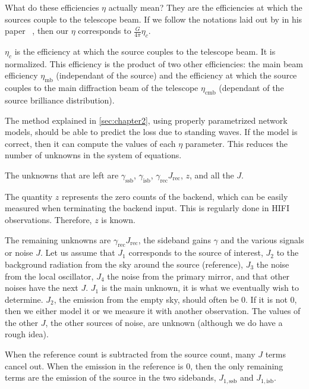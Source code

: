 What do these efficiencies $\eta$ actually mean?
They are the efficiencies at which the sources couple to the telescope beam.
If we follow the notations laid out by \citeauthor{mangum2006tempscales} in his paper ~\cite{mangum2006tempscales},
then our $\eta$ corresponds to $\frac{G}{4\pi}\eta_c$.

$\eta_c$ is the efficiency at which the source couples to the telescope beam.
It is normalized.
This efficiency is the product of two other efficiencies: the main beam efficiency $\eta_\text{mb}$ (independant of the source) and the efficiency at which the source couples to the main diffraction beam of the telescope $\eta_\text{cmb}$ (dependant of the source brilliance distribution).




The method explained in \cref{sec:chapter2}, using properly parametrized network models, should be able to predict the loss due to standing waves.
If the model is correct, then it can compute the values of each $\eta$ parameter.
This reduces the number of unknowns in the system of equations.

The unknowns that are left are $\gamma_\text{ssb}$, $\gamma_\text{isb}$,
$\gamma_\text{rec} J_\text{rec}$, $z$, and all the $J$.

The quantity $z$ represents the zero counts of the backend, which can be easily measured when terminating the backend input.
This is regularly done in HIFI observations.
Therefore, $z$ is known.

The remaining unknowns are $\gamma_\text{rec} J_\text{rec}$, the sideband gains $\gamma$ and the various signals or noise $J$.
Let us assume that $J_1$ corresponds to the source of interest, $J_2$ to the background radiation from the sky around the source (reference), $J_3$ the noise from the local oscillator, $J_4$ the noise from the primary mirror, and that other noises have the next $J$.
$J_1$ is the main unknown, it is what we eventually wish to determine.
$J_2$, the emission from the empty sky, should often be 0.  If it is not 0, then we either model it or we measure it with another observation.
The values of the other $J$, the other sources of noise, are unknown (although we do have a rough idea).

When the reference count is subtracted from the source count, many $J$ terms cancel out.
When the emission in the reference is 0, then the only remaining terms are the emission of the source in the two sidebands, $J_{1,\text{ssb}}$ and $J_{1,\text{isb}}$.

